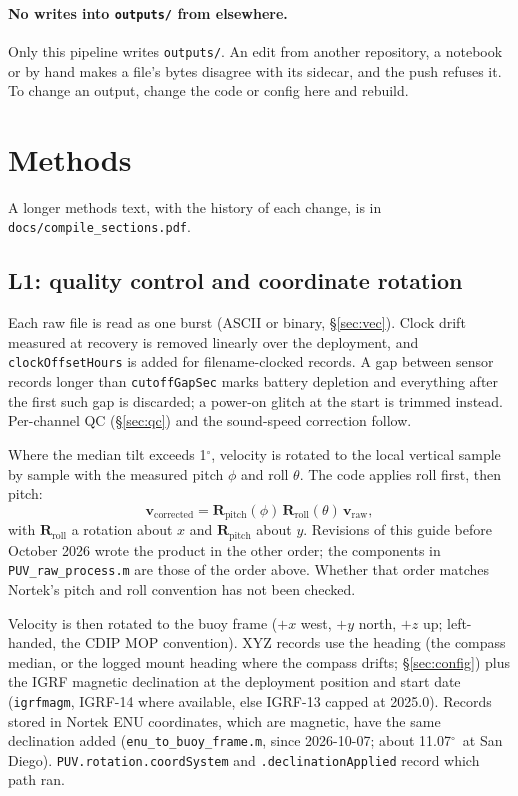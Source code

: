 \documentclass[11pt]{article}
\newcommand{\code}[1]{\texttt{#1}}
\providecommand{\degree}{\ensuremath{^{\circ}}}
\begin{document}
\paragraph{No writes into \code{outputs/} from elsewhere.} Only this pipeline writes
\code{outputs/}. An edit from another repository, a notebook or by hand makes a file's bytes
disagree with its sidecar, and the push refuses it. To change an output, change the code or
config here and rebuild.

\section{Methods}
\label{sec:methods}

A longer methods text, with the history of each change, is in \code{docs/compile\_sections.pdf}.

\subsection{L1: quality control and coordinate rotation}

Each raw file is read as one burst (ASCII or binary, \S\ref{sec:vec}). Clock drift measured at
recovery is removed linearly over the deployment, and \code{clockOffsetHours} is added for
filename-clocked records. A gap between sensor records longer than \code{cutoffGapSec} marks
battery depletion and everything after the first such gap is discarded; a power-on glitch at the
start is trimmed instead. Per-channel QC (\S\ref{sec:qc}) and the sound-speed correction follow.

Where the median tilt exceeds 1\degree, velocity is rotated to the local vertical sample by sample
with the measured pitch $\phi$ and roll $\theta$. The code applies roll first, then pitch:
\[
  \mathbf{v}_\text{corrected}
  = \mathbf{R}_\text{pitch}(\phi)\,\mathbf{R}_\text{roll}(\theta)\,\mathbf{v}_\text{raw},
\]
with $\mathbf{R}_\text{roll}$ a rotation about $x$ and $\mathbf{R}_\text{pitch}$ about $y$.
Revisions of this guide before October 2026 wrote the product in the other order; the
components in \code{PUV\_raw\_process.m} are those of the order above. Whether that order matches
Nortek's pitch and roll convention has not been checked.

Velocity is then rotated to the buoy frame ($+x$ west, $+y$ north, $+z$ up; left-handed, the
CDIP MOP convention). XYZ records use the heading (the compass median, or the logged mount heading
where the compass drifts; \S\ref{sec:config}) plus the IGRF magnetic declination at the deployment
position and start date (\code{igrfmagm}, IGRF-14 where available, else IGRF-13 capped at 2025.0).
Records stored in Nortek ENU coordinates, which are magnetic, have the same declination added
(\code{enu\_to\_buoy\_frame.m}, since 2026-10-07; about 11.07\degree\ at San Diego).
\code{PUV.rotation.coordSystem} and \code{.declinationApplied} record which path ran.
\end{document}
